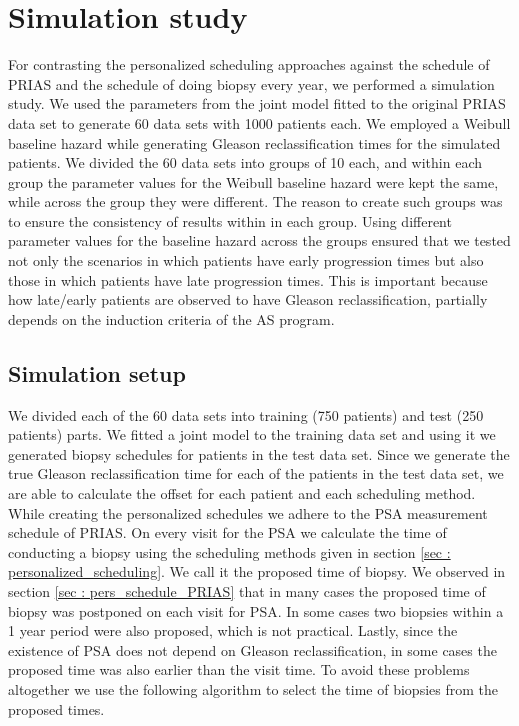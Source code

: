 
\section{Simulation study}
\label{sec: simulation_study}
For contrasting the personalized scheduling approaches against the schedule of PRIAS and the schedule of doing biopsy every year, we performed a simulation study. We used the parameters from the joint model fitted to the original PRIAS data set to generate 60 data sets with 1000 patients each. We employed a Weibull baseline hazard while generating Gleason reclassification times for the simulated patients. We divided the 60 data sets into groups of 10 each, and within each group the parameter values for the Weibull baseline hazard were kept the same, while across the group they were different. The reason to create such groups was to ensure the consistency of results within in each group. Using different parameter values for the baseline hazard across the groups ensured that we tested not only the scenarios in which patients have early progression times but also those in which patients have late progression times. This is important because how late/early patients are observed to have Gleason reclassification, partially depends on the induction criteria of the AS program.

\subsection{Simulation setup}
\label{subsec : simulation_setup}
We divided each of the 60 data sets into training (750 patients) and test (250 patients) parts. We fitted a joint model to the training data set and using it we generated biopsy schedules for patients in the test data set. Since we generate the true Gleason reclassification time for each of the patients in the test data set, we are able to calculate the offset for each patient and each scheduling method. While creating the personalized schedules we adhere to the PSA measurement schedule of PRIAS. On every visit for the PSA we calculate the time of conducting a biopsy using the scheduling methods given in section \ref{sec : personalized_scheduling}. We call it the proposed time of biopsy. We observed in section \ref{sec : pers_schedule_PRIAS} that in many cases the proposed time of biopsy was postponed on each visit for PSA. In some cases two biopsies within a 1 year period were also proposed, which is not practical. Lastly, since the existence of PSA does not depend on Gleason reclassification, in some cases the proposed time was also earlier than the visit time. To avoid these problems altogether we use the following algorithm to select the time of biopsies from the proposed times.\\

